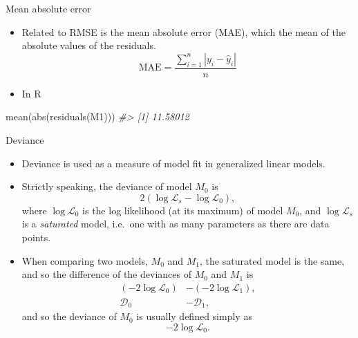 \documentclass[
  10pt,
  ignorenonframetext,
]{beamer}
\newenvironment{Shaded}{\begin{snugshade}}{\end{snugshade}}
\newcommand{\CommentTok}[1]{\textcolor[rgb]{0.56,0.35,0.01}{\textit{#1}}}
\newcommand{\FunctionTok}[1]{\textcolor[rgb]{0.00,0.00,0.00}{#1}}
\newcommand{\NormalTok}[1]{#1}
\providecommand{\tightlist}{%
  \setlength{\itemsep}{0pt}\setlength{\parskip}{0pt}}
\begin{document}
\begin{frame}[fragile]{Mean absolute error}
\protect\hypertarget{mean-absolute-error}{}
\begin{itemize}
\tightlist
\item
  Related to RMSE is the mean absolute error (MAE), which the mean of
  the absolute values of the residuals. \[
  \text{MAE} = \frac{\sum_{i=1}^n|y_i - \hat{y}_i|}{n}
  \]
\item
  In R
\end{itemize}

\begin{Shaded}
\begin{Highlighting}[]
\FunctionTok{mean}\NormalTok{(}\FunctionTok{abs}\NormalTok{(}\FunctionTok{residuals}\NormalTok{(M1)))}
\CommentTok{\#\textgreater{} [1] 11.58012}
\end{Highlighting}
\end{Shaded}
\end{frame}

\begin{frame}{Deviance}
\protect\hypertarget{deviance}{}
\begin{itemize}
\tightlist
\item
  Deviance is used as a measure of model fit in generalized linear
  models.
\item
  Strictly speaking, the deviance of model \(M_0\) is \[
  2 \left(\log\mathcal{L}_{s} - \log\mathcal{L}_{0} \right),
  \] where \(\log\mathcal{L}_{0}\) is the log likelihood (at its
  maximum) of model \(M_0\), and \(\log\mathcal{L}_{s}\) is a
  \emph{saturated} model, i.e.~one with as many parameters as there are
  data points.
\item
  When comparing two models, \(M_0\) and \(M_1\), the saturated model is
  the same, and so the difference of the deviances of \(M_0\) and
  \(M_1\) is \[
  \begin{aligned}
  (- 2 \log\mathcal{L}_{0}) &- (- 2 \log\mathcal{L}_{1}),\\
  \mathcal{D}_0 &- \mathcal{D}_1,
  \end{aligned}
  \] and so the deviance of \(M_0\) is usually defined simply as \[
  -2 \log\mathcal{L}_{0}.
  \]
\end{itemize}
\end{frame}
\end{document}
